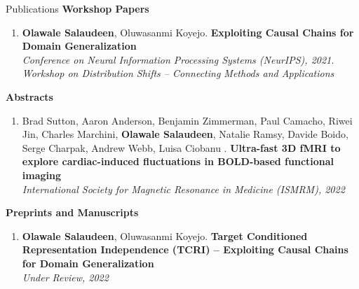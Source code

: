 \documentclass{resume} %
\begin{document}
\begin{rSection}{Publications}
\textbf{Workshop Papers}
\begin{enumerate}[label={\arabic*.}]
\item \textbf{Olawale Salaudeen}, Oluwasanmi Koyejo. \textbf{Exploiting Causal Chains for Domain Generalization}\\
\textit{Conference on Neural Information Processing Systems (NeurIPS), 2021. Workshop on Distribution Shifts -- Connecting Methods and Applications}
\end{enumerate}
\textbf{Abstracts}
\begin{enumerate}[label={\arabic*.}]
\item Brad Sutton, Aaron Anderson, Benjamin Zimmerman, Paul Camacho, Riwei Jin, Charles Marchini, \textbf{Olawale Salaudeen}, Natalie Ramsy, Davide Boido, Serge Charpak, Andrew Webb, Luisa Ciobanu . \textbf{Ultra-fast 3D fMRI to explore cardiac-induced fluctuations in BOLD-based functional imaging}\\
\textit{International Society for Magnetic Resonance in Medicine (ISMRM), 2022}
\end{enumerate}
\textbf{Preprints and Manuscripts}
\begin{enumerate}[label={\arabic*.}]
\item \textbf{Olawale Salaudeen}, Oluwasanmi Koyejo. \textbf{Target Conditioned Representation Independence (TCRI) -- Exploiting Causal Chains for Domain Generalization}\\
\textit{Under Review, 2022}
\end{enumerate}
\end{rSection}
\end{document}
